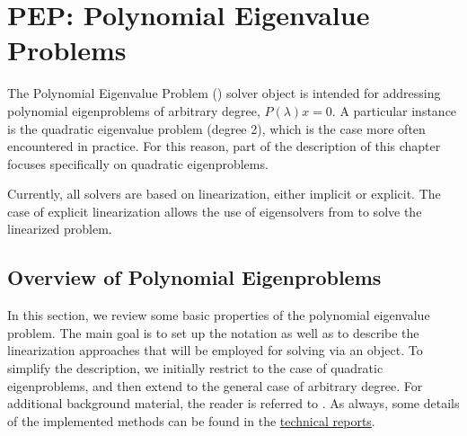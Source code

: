 \chapter{\label{cap:pep}PEP: Polynomial Eigenvalue Problems}

\begin{center}
  {\setlength{\fboxsep}{4mm}
  }
\end{center}

\noindent The Polynomial Eigenvalue Problem () solver object is intended for addressing polynomial eigenproblems of arbitrary degree, $P(\lambda)x=0$. A particular instance is the quadratic eigenvalue problem (degree 2), which is the case more often encountered in practice. For this reason, part of the description of this chapter focuses specifically on quadratic eigenproblems.

Currently, all  solvers are based on linearization, either implicit or explicit. The case of explicit linearization allows the use of eigensolvers from  to solve the linearized problem.

\section{\label{sec:pep}Overview of Polynomial Eigenproblems}

In this section, we review some basic properties of the polynomial eigenvalue problem. The main goal is to set up the notation as well as to describe the linearization approaches that will be employed for solving via an  object.
To simplify the description, we initially restrict to the case of quadratic eigenproblems, and then extend to the general case of arbitrary degree.
For additional background material, the reader is referred to \citep{Tisseur:2001:QEP}. As always, some details of the implemented methods can be found in the \slepc \hyperlink{str}{technical reports}.


